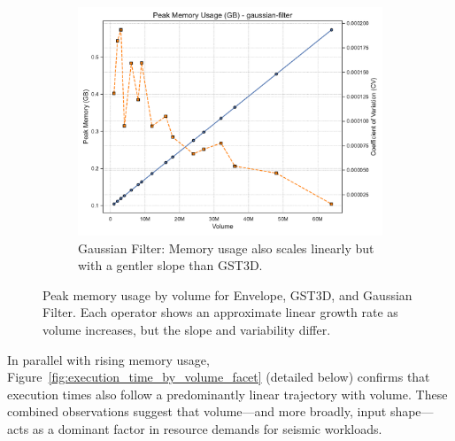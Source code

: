 \begin{figure}[htbp]
\begin{subfigure}[t]{0.49\textwidth}
    \end{subfigure}
    \hfill
    \begin{subfigure}[t]{0.49\textwidth}
        \centering
        \includegraphics[width=\textwidth]{assets/images/05/peak_memory_by_volume_gaussian-filter}
        \caption{Gaussian Filter: Memory usage also scales linearly but with a gentler slope than \ac{GST3D}.}
    \end{subfigure}
    \caption{Peak memory usage by volume for Envelope, \ac{GST3D}, and Gaussian Filter. Each operator shows an approximate linear growth rate as volume increases, but the slope and variability differ.}
    \label{fig:peak_memory_facet}
\end{figure}

In parallel with rising memory usage, Figure~\ref{fig:execution_time_by_volume_facet} (detailed below) confirms that execution times also follow a predominantly linear trajectory with volume.
These combined observations suggest that volume—and more broadly, input shape—acts as a dominant factor in resource demands for seismic workloads.

